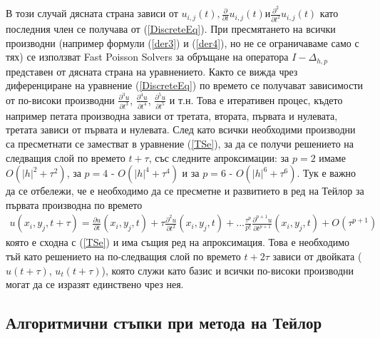 \documentclass{article}
\newcommand{\rf}[1]{(\ref{#1})}
\begin{document}
В този случай дясната страна зависи от $u_{i, j}(t), \frac{\partial}{\partial t}u_{i, j}(t) и \frac{\partial^2}{\partial t^2}u_{i, j}(t)$ като последния член се получава от \rf{DiscreteEq}. При пресмятането на всички производни (например формули \rf{der3} и \rf{der4}, но не се ограничаваме само с тях) се използват Fast Poisson Solvers за обръщане на оператора $I-\Delta_{h,p}$ представен от дясната страна на уравнението. Както се вижда чрез диференциране на уравнение \rf{DiscreteEq} по времето се получават зависимости от по-високи производни $\frac{\partial^3 u}{\partial t^3}$, $\frac{\partial^4 u}{\partial t^4}$, $\frac{\partial^5 u}{\partial t^5}$ и т.н. Това е итеративен процес, където например петата производна зависи от третата, втората, първата и нулевата, третата зависи от първата и нулевата. След като всички необходими производни са пресметнати се заместват в уравнение \rf{TSe}, за да се получи решението на следващия слой по времето $t+\tau$, със следните апроксимации: за $p=2$ имаме $O(|h|^2 + \tau^2)$, за $p=4$ - $O(|h|^4 + \tau^4)$ и за $p=6$ - $O(|h|^6 + \tau^6)$. Тук е важно да се отбележи, че е необходимо да се пресметне и развитието в ред на Тейлор за първата производна по времето
\begin{align} \label{TSeDer}
u(x_i, y_j, t+\tau) = \frac{ \partial u }{ \partial t }(x_i, y_j, t) + \tau \frac{ \partial^2 u }{ \partial t^2 }(x_i, y_j, t)  + ... 
\frac{ \tau^p }{ p! } \frac{ \partial^{p+1} u }{ \partial t^{p+1} }(x_i, y_j, t) + O(\tau^{p+1})
\end{align}
която е сходна с \rf{TSe} и има същия ред на апроксимация. Това е необходимо тъй като решението на по-следващия слой по времето $t+2\tau$ зависи от двойката ($u(t+\tau)$, $u_t(t+\tau)$), която служи като базис и всички по-високи производни могат да се изразят единствено чрез нея.

\subsection{Алгоритмични стъпки при метода на Тейлор}
\end{document}
